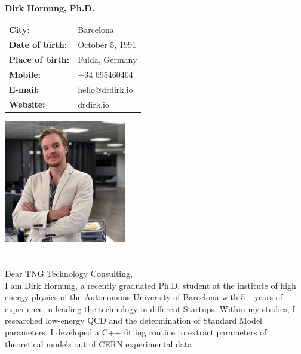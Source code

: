 \documentclass[11pt]{article}
\begin{document}
\Large
\noindent
\textbf{Dirk Hornung, Ph.D.} \\

\normalsize
\noindent
\begin{minipage}{0.5\linewidth}
  \begin{tabularx}{0.6\textwidth}{>{\bfseries}l l}
    City:           & Barcelona \\
    Date of birth:  & October 5, 1991\\
    Place of birth: & Fulda, Germany \\
    Mobile:         & +34 695460404 \\
    E-mail:         & hello@drdirk.io \\
    Website:      	& drdirk.io
  \end{tabularx}
\end{minipage}
\begin{minipage}{0.5\linewidth}
  \begin{flushright}
    \includegraphics[width=0.4\textwidth]{dirk.png}
  \end{flushright}
\end{minipage}

 \section*{}

 \vspace{1cm}



 Dear TNG Technology Consulting, \\

 \noindent I am Dirk Hornung, a recently graduated Ph.D. student at the
 institute of high energy physics of the Autonomous University of Barcelona with
 5+ years of experience in leading the technology in different Startups. Within
 my studies, I researched low-energy QCD and the determination of Standard Model
 parameters. I developed a C++ fitting routine to extract parameters of
 theoretical models out of CERN experimental data. \\
\end{document}
